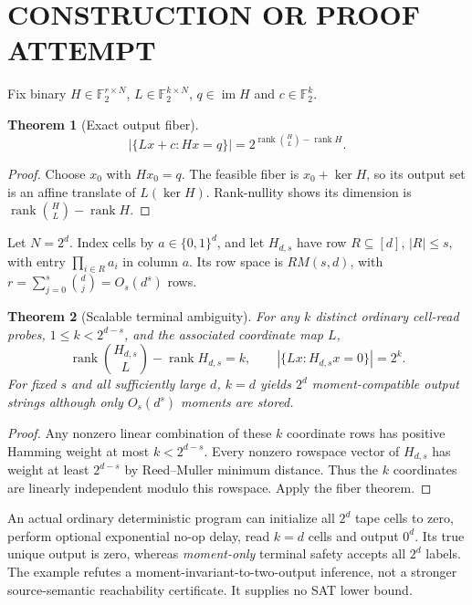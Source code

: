 \documentclass[11pt]{article}
\newtheorem{theorem}{Theorem}
\begin{document}
\section{CONSTRUCTION OR PROOF ATTEMPT}
Fix binary $H\in\mathbb F_2^{r\times N}$, $L\in\mathbb F_2^{k\times N}$, $q\in\operatorname{im}H$ and $c\in\mathbb F_2^k$.
\begin{theorem}[Exact output fiber]
\[
\left|\{Lx+c:Hx=q\}\right|
=2^{\operatorname{rank}\binom HL-\operatorname{rank}H}.
\]
\end{theorem}
\begin{proof} Choose $x_0$ with $Hx_0=q$. The feasible fiber is $x_0+\ker H$, so its output set is an affine translate of $L(\ker H)$. Rank-nullity shows its dimension is $\operatorname{rank}\binom HL-\operatorname{rank}H$.
\end{proof}

Let $N=2^d$. Index cells by $a\in\{0,1\}^d$, and let $H_{d,s}$ have row $R\subseteq[d]$, $|R|\le s$, with entry $\prod_{i\in R}a_i$ in column $a$. Its row space is $RM(s,d)$, with $r=\sum_{j=0}^s\binom dj=O_s(d^s)$ rows.
\begin{theorem}[Scalable terminal ambiguity]
For any $k$ distinct ordinary cell-read probes, $1\le k<2^{d-s}$, and the associated coordinate map $L$,
\[
\operatorname{rank}\binom{H_{d,s}}L-\operatorname{rank}H_{d,s}=k,\qquad
\left|\{Lx:H_{d,s}x=0\}\right|=2^k.
\]
For fixed $s$ and all sufficiently large $d$, $k=d$ yields $2^d$ moment-compatible output strings although only $O_s(d^s)$ moments are stored.
\end{theorem}
\begin{proof}
Any nonzero linear combination of these $k$ coordinate rows has positive Hamming weight at most $k<2^{d-s}$. Every nonzero rowspace vector of $H_{d,s}$ has weight at least $2^{d-s}$ by Reed--Muller minimum distance. Thus the $k$ coordinates are linearly independent modulo this rowspace. Apply the fiber theorem.
\end{proof}
An actual ordinary deterministic program can initialize all $2^d$ tape cells to zero, perform optional exponential no-op delay, read $k=d$ cells and output $0^d$. Its true unique output is zero, whereas \emph{moment-only} terminal safety accepts all $2^d$ labels. The example refutes a moment-invariant-to-two-output inference, not a stronger source-semantic reachability certificate. It supplies no SAT lower bound.
\end{document}
